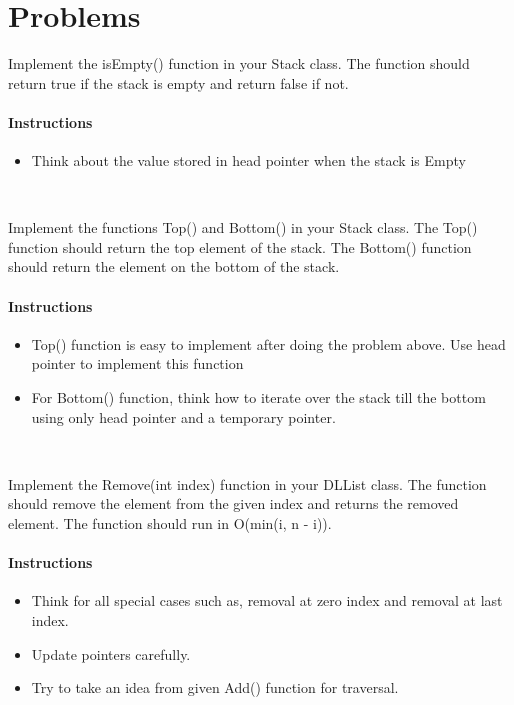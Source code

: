 \documentclass[11pt,fleqn]{book} %
\begin{document}
 \section{Problems}
 \begin{problem}
 	Implement the isEmpty() function in your Stack class. The function should return true if the stack is empty and return false if not.
 	\paragraph{Instructions}
 	\begin{itemize}
 		\item Think about the value stored in head pointer when the stack is Empty
 	\end{itemize}
 \end{problem}
~\\
\begin{problem}
	Implement the  functions Top() and Bottom() in your Stack class. The Top() function should return the top element of the stack. The Bottom() function should return the element on the bottom of the stack.
	\paragraph{Instructions}
		\begin{itemize}
			\item Top() function is easy to implement after doing the problem above. Use head pointer to implement this function
			\item For Bottom() function, think how to iterate over the stack till the bottom using only head pointer and a temporary pointer.
		\end{itemize}
\end{problem}
~\\
\begin{problem}
	Implement the Remove(int index) function in your DLList class. The function should remove the element from the given index and returns the removed element. The function should run in O(min(i, n - i)).
	\paragraph{Instructions}
	\begin{itemize}
		\item Think for all special cases such as, removal at zero index and removal at last index.
		\item Update pointers carefully.
		\item Try to take an idea from given Add() function for traversal.
	\end{itemize}
\end{problem}
\end{document}
